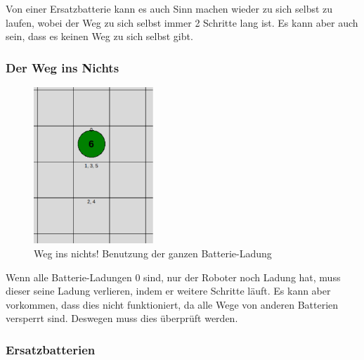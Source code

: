 \documentclass[a4paper,12pt,arial]{scrartcl}
\begin{document}
Von einer Ersatzbatterie kann es auch Sinn machen wieder zu sich selbst zu laufen, wobei der Weg zu sich selbst immer 2 Schritte lang ist. Es kann aber auch sein, dass es keinen Weg zu sich selbst gibt.

\newpage

\subsubsection{Der Weg ins Nichts}
\captionsetup[figure]{name=Abb.}
\begin{figure}[h]
    \centering
    \includegraphics[width=0.4\textwidth]{way_ins_nothing.pdf}
    \caption{Weg ins nichts! Benutzung der ganzen Batterie-Ladung}
    \label{fig:way_to_nothing}
\end{figure}
\captionsetup[figure]{name=Abbildung}

Wenn alle Batterie-Ladungen 0 sind, nur der Roboter noch Ladung hat, muss dieser seine Ladung verlieren, indem er weitere Schritte läuft. Es kann aber vorkommen, dass dies nicht funktioniert, da alle Wege von anderen Batterien versperrt sind. Deswegen muss dies überprüft werden.

\subsubsection{Ersatzbatterien}
\end{document}
